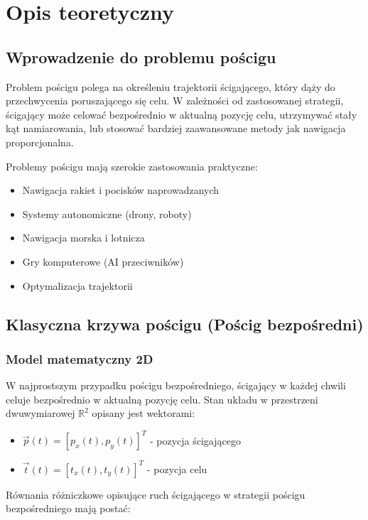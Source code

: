 \documentclass[12pt,a4paper]{article}
\begin{document}
\section{Opis teoretyczny}

\subsection{Wprowadzenie do problemu pościgu}

Problem pościgu polega na określeniu trajektorii ścigającego, który dąży do przechwycenia poruszającego się celu. W zależności od zastosowanej strategii, ścigający może celować bezpośrednio w aktualną pozycję celu, utrzymywać stały kąt namiarowania, lub stosować bardziej zaawansowane metody jak nawigacja proporcjonalna.

Problemy pościgu mają szerokie zastosowania praktyczne:
\begin{itemize}
    \item Nawigacja rakiet i pocisków naprowadzanych
    \item Systemy autonomiczne (drony, roboty)
    \item Nawigacja morska i lotnicza
    \item Gry komputerowe (AI przeciwników)
    \item Optymalizacja trajektorii
\end{itemize}

\subsection{Klasyczna krzywa pościgu (Pościg bezpośredni)}

\subsubsection{Model matematyczny 2D}

W najprostszym przypadku pościgu bezpośredniego, ścigający w każdej chwili celuje bezpośrednio w aktualną pozycję celu. Stan układu w przestrzeni dwuwymiarowej $\mathbb{R}^2$ opisany jest wektorami:

\begin{itemize}
    \item $\vec{p}(t) = [p_x(t), p_y(t)]^T$ - pozycja ścigającego
    \item $\vec{t}(t) = [t_x(t), t_y(t)]^T$ - pozycja celu
\end{itemize}

Równania różniczkowe opisujące ruch ścigającego w strategii pościgu bezpośredniego mają postać:
\end{document}
